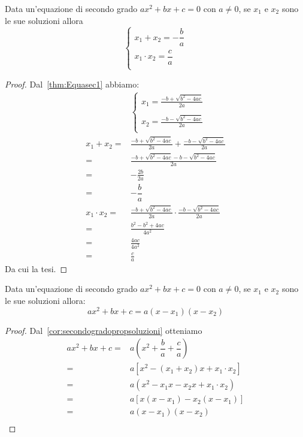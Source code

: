\begin{cor}\label{cor:secondogradopropsoluzioni}
Data un'equazione di secondo grado $ax^2+bx+c=0$ con $a\neq 0$, se $x_1$ e $x_2$ sono le sue soluzioni allora\[\begin{cases}
	x_1+x_2=-\dfrac{b}{a}\\
	x_1\cdot x_2=\dfrac{c}{a}\\
\end{cases}\]
\end{cor}
\begin{proof}Dal~\vref{thm:Equasec1} abbiamo:
	\begin{align*}
	&\begin{cases}
	x_1=\frac{-b+\sqrt{b^2-4ac}}{2a}\\
	\\
	x_2=\frac{-b-\sqrt{b^2-4ac}}{2a}\\
	\end{cases}\\
	x_1+x_2=&\frac{-b+\sqrt{b^2-4ac}}{2a}+\frac{-b-\sqrt{b^2-4ac}}{2a}\\
	=&\frac{-b+\sqrt{b^2-4ac}-b-\sqrt{b^2-4ac}}{2a}\\
	=&-\frac{2b}{2a}\\
	=&-\dfrac{b}{a}\\
	x_1\cdot x_2=&\frac{-b+\sqrt{b^2-4ac}}{2a}\cdot\frac{-b-\sqrt{b^2-4ac}}{2a}\\
	=&\frac{b^2-b^2+4ac}{4a^2}\\
	=&\frac{4ac}{4a^2}\\
	=&\frac{c}{a}
	\end{align*}
	Da cui la tesi.
\end{proof}
\begin{cor}\label{cor:Scomposizionetrisecgrad}
Data un'equazione di secondo grado $ax^2+bx+c=0$ con $a\neq 0$, se $x_1$ e $x_2$ sono le sue soluzioni allora:\[ax^2+bx+c=a\left(x-x_1\right)\left(x-x_2\right) \]
\end{cor}
\begin{proof}Dal~\vref{cor:secondogradopropsoluzioni} otteniamo
	\begin{align*}
ax^2+bx+c=&a\left(x^2+\dfrac{b}{a}+\dfrac{c}{a}\right)\\
=&a\left[x^2-\left(x_1+x_2\right)x+x_1\cdot x_2\right]\\
=&a\left(x^2-x_1x-x_2x+x_1\cdot x_2\right)\\
=&a\left[x\left(x-x_1\right)-x_2\left(x-x_1\right)\right]\\
=&a\left(x-x_1\right)\left(x-x_2\right)\\
	\end{align*}
\end{proof}
